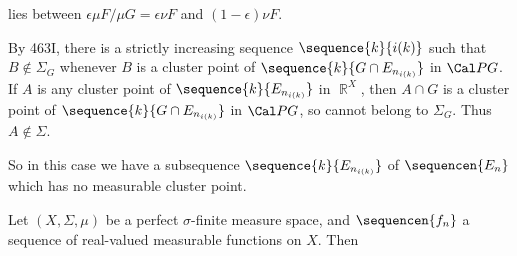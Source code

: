 {\noindent lies between $\epsilon\mu F/\mu G=\epsilon\nu F$ and
$(1-\epsilon)\nu F$.

By 463I, there is a strictly increasing sequence $\sequence{k}{i(k)}$
such that $B\notin\Sigma_G$ whenever $B$ is a cluster point of
$\sequence{k}{G\cap E_{n_{i(k)}}}$ in $\Cal PG$.
If $A$ is any cluster point of $\sequence{k}{E_{n_{i(k)}}}$ in
$\BbbR^X$, then $A\cap G$ is a cluster point of $\sequence{k}{G\cap
E_{n_{i(k)}}}$ in $\Cal PG$, so cannot belong to $\Sigma_G$.   Thus
$A\notin\Sigma$.

So in this case we have a subsequence $\sequence{k}{E_{n_{i(k)}}}$ of
$\sequencen{E_n}$ which has no measurable cluster point.
}%

 Let
$(X,\Sigma,\mu)$ be a perfect $\sigma$-finite measure space, and
$\sequencen{f_n}$ a sequence of real-valued measurable functions on $X$.
Then



